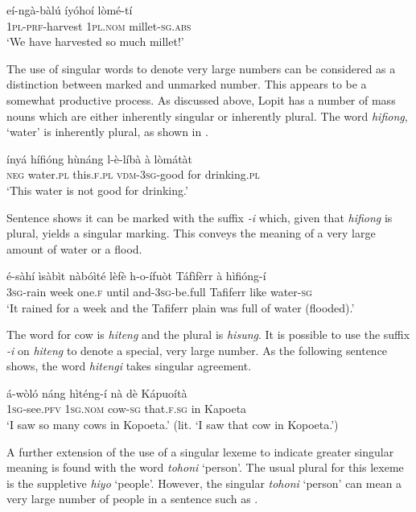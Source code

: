 \documentclass[output=paper]{langsci/langscibook}
\begin{document}
\ea\label{ex:moodie:10}
\gll eí-ngà-bàlú íyóhoí lòmé-tí \\
1\textsc{pl-prf}-harvest 1\textsc{pl.nom} millet-\textsc{sg.abs} \\
\glt ‘We have harvested so much millet!’
\z

The use of singular words to denote very large numbers can be considered as a distinction between marked and unmarked number. This appears to be a somewhat productive process. As discussed above, Lopit has a number of mass nouns which are either inherently singular or inherently plural. The word \textit{hifiong}, ‘water’ is inherently plural, as shown in .

\ea\label{ex:moodie:11}
\gll ínyá hífióng hùnáng l-è-líbà à lòmátàt \\
\textsc{neg} water.\textsc{pl} this.\textsc{f.pl} \textsc{vdm-3sg}-good for drinking.\textsc{pl} \\
\glt ‘This water is not good for drinking.’
\z

Sentence  shows it can be marked with the suffix \textit{-i} which, given that \textit{hifiong} is plural, yields a singular marking. This conveys the meaning of a very large amount of water or a flood.

\ea\label{ex:moodie:12}
\gll é-sàhí ìsàbìt nàbóìté lèfè h-o-ífuòt Táfìfèrr à hìfióng-í \\
\textsc{3sg}-rain week one.\textsc{f} until and-3\textsc{sg}-be.full Tafiferr like water-\textsc{sg} \\
\glt ‘It rained for a week and the Tafiferr plain was full of water (flooded).’ 
\z

The word for cow is \textit{hiteng} and the plural is \textit{hisung}. It is possible to use the suffix \textit{-i} on \textit{hiteng} to denote a special, very large number. As the following sentence shows, the word \textit{hitengi} takes singular agreement.

\ea\label{ex:moodie:13}
\gll á-wòló náng hìténg-í nà dè Kápuoítà \\
1\textsc{sg}-see.\textsc{pfv} 1\textsc{sg.nom} cow-\textsc{sg} that.\textsc{f.sg} in Kapoeta \\
\glt ‘I saw so many cows in Kopoeta.’ (lit. ‘I saw that cow in Kopoeta.’)
\z

A further extension of the use of a singular lexeme to indicate greater singular meaning is found with the word \textit{tohoni} ‘person’. The usual plural for this lexeme is the suppletive \textit{hiyo} ‘people’. However, the singular \textit{tohoni} ‘person’ can mean a very large number of people in a sentence such as .
\end{document}
